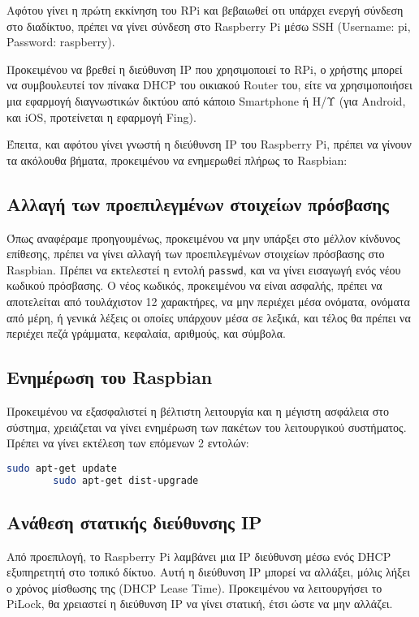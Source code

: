 	Αφότου γίνει η πρώτη εκκίνηση του RPi και βεβαιωθεί οτι υπάρχει ενεργή σύνδεση στο διαδίκτυο, πρέπει να γίνει σύνδεση στο Raspberry Pi μέσω SSH (Username: pi, Password: raspberry)\textsuperscript{\cite{default_creds}}.

	Προκειμένου να βρεθεί η διεύθυνση IP που χρησιμοποιεί το RPi, ο χρήστης μπορεί να συμβουλευτεί τον πίνακα DHCP του οικιακού Router του, είτε να χρησιμοποιήσει μια εφαρμογή διαγνωστικών δικτύου από κάποιο Smartphone ή Η/Υ (για Android, και iOS, προτείνεται η εφαρμογή Fing)\textsuperscript{\cite{find_rpi_ip}}.

	Έπειτα, και αφότου γίνει γνωστή η διεύθυνση IP του Raspberry Pi, πρέπει να γίνουν τα ακόλουθα βήματα, προκειμένου να ενημερωθεί πλήρως το Raspbian:

	\subsection{Αλλαγή των προεπιλεγμένων στοιχείων πρόσβασης}
		Όπως αναφέραμε προηγουμένως, προκειμένου να μην υπάρξει στο μέλλον κίνδυνος επίθεσης, πρέπει να γίνει αλλαγή των προεπιλεγμένων στοιχείων πρόσβασης στο Raspbian. Πρέπει να εκτελεστεί η εντολή \verb|passwd|, και να γίνει εισαγωγή ενός νέου κωδικού πρόσβασης. Ο νέος κωδικός, προκειμένου να είναι ασφαλής, πρέπει να αποτελείται από τουλάχιστον 12 χαρακτήρες, να μην περιέχει μέσα ονόματα, ονόματα από μέρη, ή γενικά λέξεις οι οποίες υπάρχουν μέσα σε λεξικά, και τέλος θα πρέπει να περιέχει πεζά γράμματα, κεφαλαία, αριθμούς, και σύμβολα\textsuperscript{\cite{secure_passwords}}.

	\subsection{Ενημέρωση του Raspbian}
		Προκειμένου να εξασφαλιστεί η βέλτιστη λειτουργία και η μέγιστη ασφάλεια στο σύστημα, χρειάζεται να γίνει ενημέρωση των πακέτων του λειτουργικού συστήματος. Πρέπει να γίνει εκτέλεση των επόμενων 2 εντολών\textsuperscript{\cite{raspbian_update}}:

		\begin{lstlisting}[language=bash]
		sudo apt-get update
		sudo apt-get dist-upgrade\end{lstlisting}

	\subsection{Ανάθεση στατικής διεύθυνσης IP}
		Από προεπιλογή, το Raspberry Pi λαμβάνει μια IP διεύθυνση μέσω ενός DHCP εξυπηρετητή στο τοπικό δίκτυο. Αυτή η διεύθυνση IP μπορεί να αλλάξει, μόλις λήξει ο χρόνος μίσθωσης της (DHCP Lease Time). Προκειμένου να λειτουργήσει το PiLock, θα χρειαστεί η διεύθυνση IP να γίνει στατική, έτσι ώστε να μην αλλάζει.

